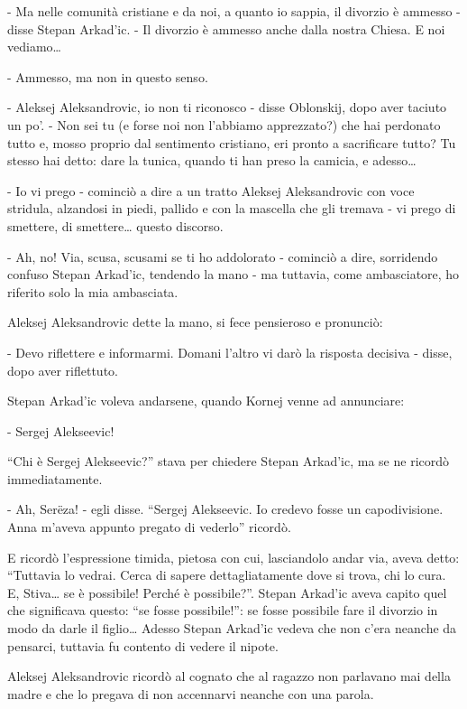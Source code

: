 - Ma nelle comunità cristiane e da noi, a quanto io sappia, il divorzio è ammesso - disse Stepan Arkad'ic. - Il divorzio è ammesso anche dalla nostra Chiesa. E noi vediamo\ldots{} 

- Ammesso, ma non in questo senso. 

- Aleksej Aleksandrovic, io non ti riconosco - disse Oblonskij, dopo aver taciuto un po'. - Non sei tu (e forse noi non l'abbiamo apprezzato?) che hai perdonato tutto e, mosso proprio dal sentimento cristiano, eri pronto a sacrificare tutto? Tu stesso hai detto: dare la tunica, quando ti han preso la camicia, e adesso\ldots{} 

- Io vi prego - cominciò a dire a un tratto Aleksej Aleksandrovic con voce stridula, alzandosi in piedi, pallido e con la mascella che gli tremava - vi prego di smettere, di smettere\ldots{} questo discorso. 
\enlargethispage*{1\baselineskip}

- Ah, no! Via, scusa, scusami se ti ho addolorato - cominciò a dire, sorridendo confuso Stepan Arkad'ic, tendendo la mano - ma tuttavia, come ambasciatore, ho riferito solo la mia ambasciata. 

Aleksej Aleksandrovic dette la mano, si fece pensieroso e pronunciò: 

- Devo riflettere e informarmi. Domani l'altro vi darò la risposta decisiva - disse, dopo aver riflettuto. 

\label{xix-6} 

Stepan Arkad'ic voleva andarsene, quando Kornej venne ad annunciare: 

- Sergej Alekseevic! 

``Chi è Sergej Alekseevic?'' stava per chiedere Stepan Arkad'ic, ma se ne ricordò immediatamente. 

- Ah, Serëza! - egli disse. ``Sergej Alekseevic. Io credevo fosse un capodivisione. Anna m'aveva appunto pregato di vederlo'' ricordò. 

E ricordò l'espressione timida, pietosa con cui, lasciandolo andar via, aveva detto: ``Tuttavia lo vedrai. Cerca di sapere dettagliatamente dove si trova, chi lo cura. E, Stiva\ldots{} se è possibile! Perché è possibile?''. Stepan Arkad'ic aveva capito quel che significava questo: ``se fosse possibile!'': se fosse possibile fare il divorzio in modo da darle il figlio\ldots{} Adesso Stepan Arkad'ic vedeva che non c'era neanche da pensarci, tuttavia fu contento di vedere il nipote. 

Aleksej Aleksandrovic ricordò al cognato che al ragazzo non parlavano mai della madre e che lo pregava di non accennarvi neanche con una parola. 

